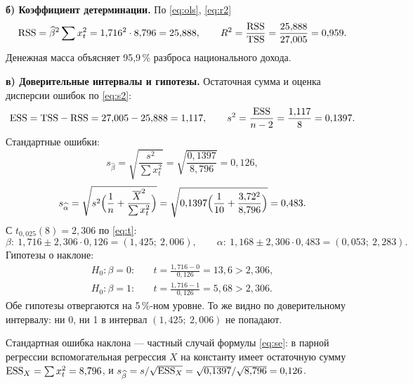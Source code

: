 \begin{solution}
\medskip
\textbf{б) Коэффициент детерминации.} По \eqref{eq:ols}, \eqref{eq:r2}
\[
  \mathrm{RSS} = \widehat{\beta}^2\sum x_t^2 = 1{,}716^2\cdot 8{,}796 = 25{,}888,
  \qquad
  R^2 = \frac{\mathrm{RSS}}{\mathrm{TSS}} = \frac{25{,}888}{27{,}005} = 0{,}959 .
\]
Денежная масса объясняет 95,9\,\% разброса национального дохода.

\medskip
\textbf{в) Доверительные интервалы и гипотезы.} Остаточная сумма и оценка
дисперсии ошибок по \eqref{eq:s2}:
\[
  \mathrm{ESS} = \mathrm{TSS} - \mathrm{RSS} = 27{,}005 - 25{,}888 = 1{,}117,
  \qquad
  s^2 = \frac{\mathrm{ESS}}{n-2} = \frac{1{,}117}{8} = 0{,}1397 .
\]
Стандартные ошибки:
\[
  s_{\widehat{\beta}} = \sqrt{\frac{s^2}{\sum x_t^2}} = \sqrt{\frac{0{,}1397}{8{,}796}} = 0{,}126,
\]
\[
  s_{\widehat{\alpha}} = \sqrt{s^2\Bigl(\frac{1}{n} + \frac{\overline{X}^2}{\sum x_t^2}\Bigr)}
                       = \sqrt{0{,}1397\Bigl(\frac{1}{10} + \frac{3{,}72^2}{8{,}796}\Bigr)} = 0{,}483 .
\]
С $t_{0{,}025}(8) = 2{,}306$ по \eqref{eq:t}:
\[
  \beta\colon\ 1{,}716 \pm 2{,}306\cdot 0{,}126 = (1{,}425;\ 2{,}006),
  \qquad
  \alpha\colon\ 1{,}168 \pm 2{,}306\cdot 0{,}483 = (0{,}053;\ 2{,}283).
\]
Гипотезы о наклоне:
\[
\begin{aligned}
  H_0\colon \beta = 0\colon&\quad t = \frac{1{,}716 - 0}{0{,}126} = 13{,}6 > 2{,}306, \\[2pt]
  H_0\colon \beta = 1\colon&\quad t = \frac{1{,}716 - 1}{0{,}126} = 5{,}68 > 2{,}306 .
\end{aligned}
\]
Обе гипотезы отвергаются на 5\,\%-ном уровне. То же видно по
доверительному интервалу: ни 0, ни 1 в интервал $(1{,}425;\ 2{,}006)$ не
попадают.

\begin{remark}
Стандартная ошибка наклона — частный случай формулы \eqref{eq:se}: в парной
регрессии вспомогательная регрессия $X$ на константу имеет остаточную сумму
$\mathrm{ESS}_X = \sum x_t^2 = 8{,}796$, и
$s_{\widehat{\beta}} = s/\sqrt{\mathrm{ESS}_X} = \sqrt{0{,}1397}/\sqrt{8{,}796} = 0{,}126$.
\end{remark}
\end{solution}
